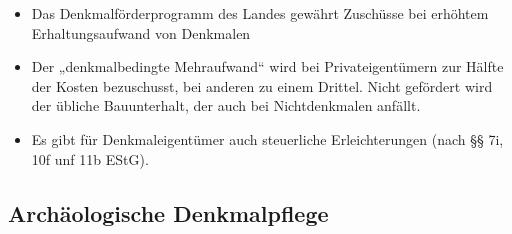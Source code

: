 \documentclass[fleqn,twoside,dvipsnames]{article}
\begin{document}
\begin{itemize}
\begin{itemize}
                    \item Das Denkmalförderprogramm des Landes gewährt Zuschüsse bei erhöhtem Erhaltungsaufwand von Denkmalen
                    \item Der „denkmalbedingte Mehraufwand“ wird bei Privateigentümern zur Hälfte der Kosten bezuschusst, bei anderen zu einem Drittel. Nicht gefördert wird der übliche Bauunterhalt, der auch bei Nichtdenkmalen anfällt.
                    \item Es gibt für Denkmaleigentümer auch steuerliche Erleichterungen (nach §§ 7i, 10f unf 11b EStG).
                \end{itemize}
        \end{itemize}
        
    \subsection{Archäologische Denkmalpflege}
\end{document}
